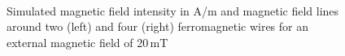 \begin{figure}
            \begin{subfigure}{0.49\textwidth}
                  \flushleft
          \end{subfigure}\hfill
        \begin{subfigure}{0.49\textwidth}
                \flushright
        \end{subfigure}
        \\        
        \caption[Simulated magnetic field intensity around two and four wires]{Simulated magnetic field intensity in A/m and magnetic field lines around two (left) and four (right) ferromagnetic wires for an external magnetic field of 20\,mT}
        \label{fig:tw_fw_mag_field}
  \end{figure}
  
